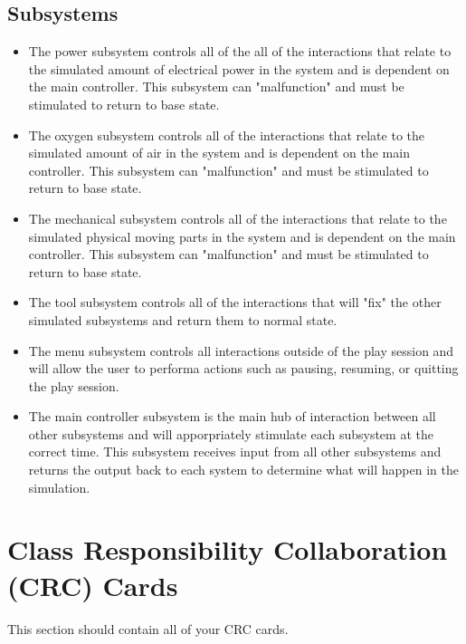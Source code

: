 \documentclass[12pt, titlepage]{article}
\begin{document}
\subsection{Subsystems}
\label{sub:subsystems}
\begin{itemize}
\item The power subsystem controls all of the all of the interactions that relate to the simulated amount of electrical power in the system and is dependent on the main controller. This subsystem can "malfunction" and must be stimulated to return to base state.
\item The oxygen subsystem controls all of the interactions that relate to the simulated amount of air in the system and is dependent on the main controller. This subsystem can "malfunction" and must be stimulated to return to base state.
\item The mechanical subsystem controls all of the interactions that relate to the simulated physical moving parts in the system and is dependent on the main controller. This subsystem can "malfunction" and must be stimulated to return to base state.
\item The tool subsystem controls all of the interactions that will "fix" the other simulated subsystems and return them to normal state.
\item The menu subsystem controls all interactions outside of the play session and will allow the user to performa actions such as pausing, resuming, or quitting the play session.
\item The main controller subsystem is the main hub of interaction between all other subsystems and will apporpriately stimulate each subsystem at the correct time. This subsystem receives input from all other subsystems and returns the output back to each system to determine what will happen in the simulation.
\end{itemize}

	
\section{Class Responsibility Collaboration (CRC) Cards}
\label{sec:class_responsibility_collaboration_crc_cards}
This section should contain all of your CRC cards.
\end{document}
